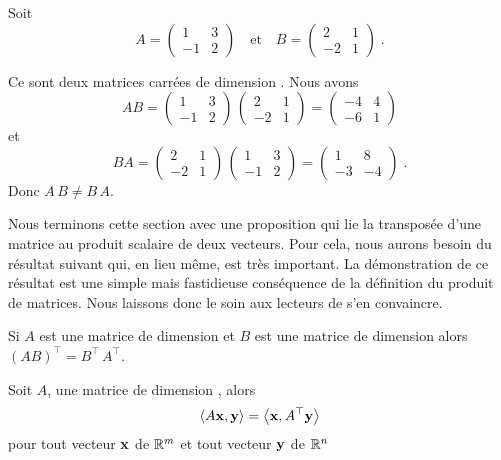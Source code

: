 {\begin{egg}
Soit
\[
A=\begin{pmatrix} 1 & 3 \\ -1 & 2 \end{pmatrix} \quad \text{et} 
\quad
B=\begin{pmatrix} 2 & 1 \\ -2 & 1 \end{pmatrix} \; .
\]

Ce sont deux matrices carrées de dimension .  Nous avons
\[
AB = \begin{pmatrix} 1 & 3 \\ -1 & 2 \end{pmatrix} \,
\begin{pmatrix} 2 & 1 \\ -2 & 1 \end{pmatrix}
= \begin{pmatrix} -4 & 4 \\ -6 & 1 \end{pmatrix}
\]
et
\[
BA = \begin{pmatrix} 2 & 1 \\ -2 & 1 \end{pmatrix} \,
\begin{pmatrix} 1 & 3 \\ -1 & 2 \end{pmatrix}
= \begin{pmatrix} 1 & 8 \\ -3 & -4 \end{pmatrix} \; .
\]
Donc $A\,B \neq B \, A$.
\end{egg}

Nous terminons cette section avec une proposition qui lie la transposée
d'une matrice au produit scalaire de deux vecteurs.  Pour cela, nous
aurons besoin du résultat suivant qui, en lieu même, est très
important.  La démonstration de ce résultat est une simple mais
fastidieuse conséquence de la définition du produit de matrices.  Nous
laissons donc le soin aux lecteurs de s'en convaincre.

\begin{focus}{\prp} \label{transpAB}
Si $A$ est une matrice de dimension  et $B$ est une matrice
de dimension  alors $(AB)^\top = B^\top\, A^\top$.
\end{focus}

\begin{focus}{\prp}
Soit $A$, une matrice de dimension , alors
\[
\left\langle{A\mathbf{x}} , {\mathbf{y}}\right\rangle = \left\langle{\mathbf{x}} , {A^\top\mathbf{y}}\right\rangle
\]
pour tout vecteur $\mathbf{x}$ de $\mathbb{R}^m$ et tout vecteur $\mathbf{y}$ de
$\mathbb{R}^n$
\end{focus}

}

